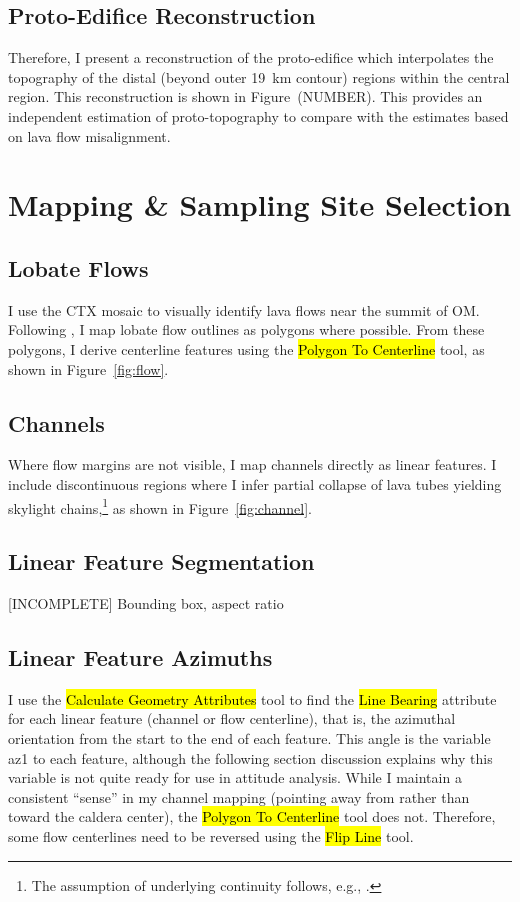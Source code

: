 \subsection{Proto-Edifice Reconstruction}
Therefore, I present a reconstruction of the proto-edifice which interpolates the topography of the distal (beyond outer \qty{19}{\km} contour) regions within the central region. This reconstruction is shown in Figure~(NUMBER). This provides an independent estimation of proto-topography to compare with the estimates based on lava flow misalignment.

\section{Mapping \& Sampling Site Selection}\label{sec:mapping}

\subsection{Lobate Flows}
I use the \ac{CTX} mosaic to visually identify lava flows near the summit of \ac{OM}. Following \textcite{mouginis-mark_geologic_2021}, I map lobate flow outlines as polygons where possible. From these polygons, I derive centerline features using the \hl{Polygon To Centerline} tool, as shown in Figure~\ref{fig:flow}.

\subsection{Channels}

Where flow margins are not visible, I map channels directly as linear features. I include discontinuous regions where I infer partial collapse of lava tubes yielding skylight chains,\footnote{The assumption of underlying continuity follows, e.g., \textcite{bleacher_olympus_2007,carr_geologic_2010,peters_lava_2021}.} as shown in Figure~\ref{fig:channel}.

\subsection{Linear Feature Segmentation}
[INCOMPLETE] Bounding box, aspect ratio

\subsection{Linear Feature Azimuths}

I use the \hl{Calculate Geometry Attributes} tool to find the \hl{Line Bearing} attribute for each linear feature (channel or flow centerline), that is, the azimuthal orientation from the start to the end of each feature. This angle is the variable \acf{az1} to each feature, although the following section discussion explains why this variable is not quite ready for use in attitude analysis. While I maintain a consistent ``sense'' in my channel mapping (pointing away from rather than toward the caldera center), the \hl{Polygon To Centerline} tool does not. Therefore, some flow centerlines need to be reversed using the \hl{Flip Line} tool.

